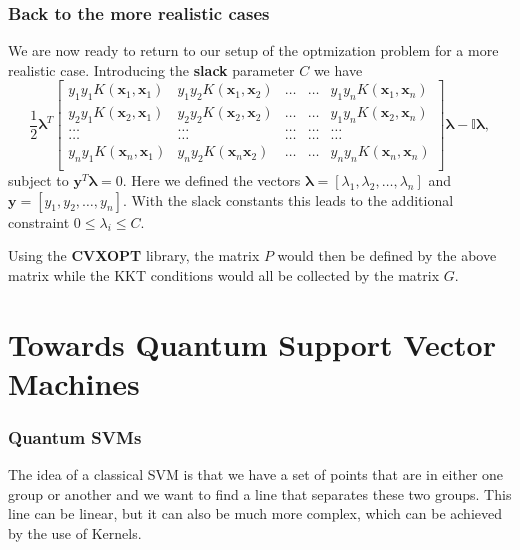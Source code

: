 \documentclass{beamer}
\begin{document}
\begin{frame}
\frametitle{Back to the more realistic cases}

We are now ready to return to our setup of the optmization problem for a more realistic case. Introducing the \textbf{slack} parameter $C$ we have
\[
\frac{1}{2} \bm{\lambda}^T\begin{bmatrix} y_1y_1K(\bm{x}_1,\bm{x}_1) & y_1y_2K(\bm{x}_1,\bm{x}_2) & \dots & \dots & y_1y_nK(\bm{x}_1,\bm{x}_n) \\
y_2y_1K(\bm{x}_2,\bm{x}_1) & y_2y_2K(\bm{x}_2,\bm{x}_2) & \dots & \dots & y_1y_nK(\bm{x}_2,\bm{x}_n) \\
\dots & \dots & \dots & \dots & \dots \\
\dots & \dots & \dots & \dots & \dots \\
y_ny_1K(\bm{x}_n,\bm{x}_1) & y_ny_2K(\bm{x}_n\bm{x}_2) & \dots & \dots & y_ny_nK(\bm{x}_n,\bm{x}_n) \\
\end{bmatrix}\bm{\lambda}-\mathbb{I}\bm{\lambda}, 
\]
subject to $\bm{y}^T\bm{\lambda}=0$. Here we defined the vectors $\bm{\lambda} =[\lambda_1,\lambda_2,\dots,\lambda_n]$ and 
$\bm{y}=[y_1,y_2,\dots,y_n]$. 
With  the slack constants this leads to the additional constraint $0\leq \lambda_i \leq C$.

Using the \textbf{CVXOPT} library, the matrix $P$ would then be defined by the above matrix while the KKT conditions would all be collected by the matrix $G$.
\end{frame}


\section{Towards Quantum Support Vector Machines}

\begin{frame}
\frametitle{Quantum SVMs}

The idea of a classical SVM is that we have a set of points
that are in either one group or another and we want to find a line that
separates these two groups. This line can be linear, but it can also be
much more complex, which can be achieved by the use of Kernels.
\end{frame}
\end{document}
